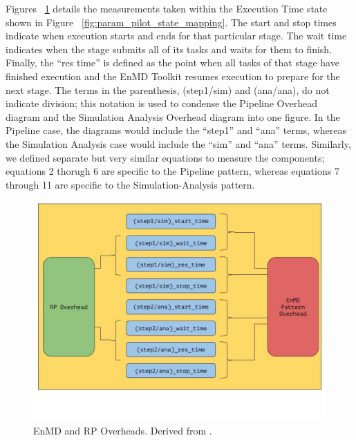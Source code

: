 \documentclass[]{article}
\begin{document}
	Figures ~\ref{fig:pattern_rp_overheads} details the measurements taken within the Execution Time state shown in Figure ~\ref{fig:param_pilot_state_mapping}. The start and stop times indicate when execution starts and ends for that particular stage. The wait time indicates when the stage submits all of its tasks and waits for them to finish. Finally, the ``res time'' is defined as the point when all tasks of that stage have finished execution and the EnMD Toolkit resumes execution to prepare for the next stage. The terms in the parenthesis, (step1/sim) and (ana/ana), do not indicate division; this notation is used to condense the Pipeline Overhead diagram and the Simulation Analysis Overhead diagram into one figure. In the Pipeline case, the diagrams would include the ``step1'' and ``ana'' terms, whereas the Simulation Analysis case would include the ``sim'' and ``ana'' terms. Similarly, we defined separate but very similar equations to measure the components; equations 2 thorugh 6 are specific to the Pipeline pattern, whereas equations 7 through 11 are specific to the Simulation-Analysis pattern.

	\begin{figure}[H]
		\centering
		\includegraphics[scale=.3]{diagrams/pattern_and_rp_overheads.jpg}
		\caption{EnMD and RP Overheads. Derived from \cite{rp_state_diagram}.}
		\label{fig:pattern_rp_overheads}
	\end{figure}
\end{document}
